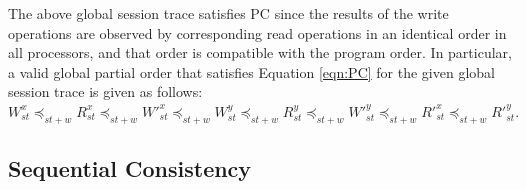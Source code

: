\documentclass[journal,compsoc]{IEEEtran}
\begin{document}
  The above global session trace satisfies PC %
   since the results of the write operations are observed by corresponding read operations in an identical order in all processors, and that order is compatible with the program order. In particular, a valid global partial order that satisfies Equation \ref{eqn:PC} for the given global session trace is given as follows: 
   $W^x_{\mathit{st}}  \preccurlyeq_{\mathit{st}+w} R^x_{\mathit{st}} \preccurlyeq_{\mathit{st}+w} W'^x_{\mathit{st}} \preccurlyeq_{\mathit{st}+w} W^y_{\mathit{st}} \preccurlyeq_{\mathit{st}+w}   R^y_{\mathit{st}} \preccurlyeq_{\mathit{st}+w} W'^y_{\mathit{st}}   \preccurlyeq_{\mathit{st}+w} R'^x_{\mathit{st}} \preccurlyeq_{\mathit{st}+w} R'^y_{\mathit{st}} .$ 

\subsection{Sequential Consistency}
\end{document}
